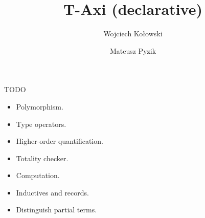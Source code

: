 \documentclass{beamer}
\title{T-Axi (declarative)}
\author
{
  Wojciech Kołowski\\
  \and
  Mateusz Pyzik\\
}
\date{}
\begin{document}
\frame{\titlepage}

\begin{frame}{TODO}

\begin{itemize}
  \item Polymorphism.
  \item Type operators.
  \item Higher-order quantification.
  \item Totality checker.
  \item Computation.
  \item Inductives and records.
  \item Distinguish partial terms.
\end{itemize}

\end{frame}








\end{document}
